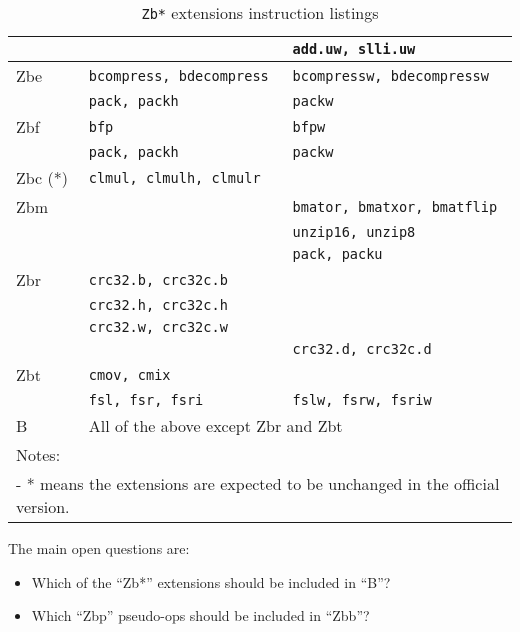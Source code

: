 \begin{table}[!h]
\begin{center}
\begin{tabular}{lll}
 & {\tt                           } & {\tt add.uw, slli.uw           } \\
\hline
Zbe
 & {\tt bcompress, bdecompress    } & {\tt bcompressw, bdecompressw  } \\
 & {\tt pack, packh               } & {\tt packw                     } \\
\hline
Zbf
 & {\tt bfp                       } & {\tt bfpw                      } \\
 & {\tt pack, packh               } & {\tt packw                     } \\
\hline
Zbc (*)
 & {\tt clmul, clmulh, clmulr     } & {\tt                           } \\
\hline
Zbm
 & {\tt                           } & {\tt bmator, bmatxor, bmatflip } \\
 & {\tt                           } & {\tt unzip16, unzip8           } \\
 & {\tt                           } & {\tt pack, packu               } \\
\hline
Zbr
 & {\tt crc32.b, crc32c.b         } & {\tt                           } \\
 & {\tt crc32.h, crc32c.h         } & {\tt                           } \\
 & {\tt crc32.w, crc32c.w         } & {\tt                           } \\
 & {\tt                           } & {\tt crc32.d, crc32c.d         } \\
\hline
Zbt
 & {\tt cmov, cmix                } & {\tt                           } \\
 & {\tt fsl, fsr, fsri            } & {\tt fslw, fsrw, fsriw         } \\
\hline
B
 & \multicolumn{2}{l}{All of the above except Zbr and Zbt} \\
\hline
Notes:\\
\multicolumn{3}{l}{- * means the extensions are expected to be unchanged in the official version.} \\
\end{tabular}
\caption{{\tt Zb*} extensions instruction listings}
\end{center}
\label{zbexts}
\end{table}

The main open questions are:
\begin{itemize}
\item Which of the ``Zb*'' extensions should be included in ``B''?
\item Which ``Zbp'' pseudo-ops should be included in ``Zbb''?
\end{itemize}

